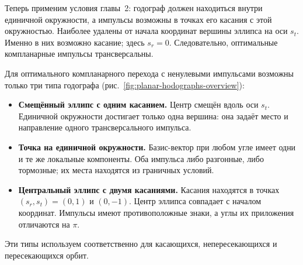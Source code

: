 Теперь применим условия главы~2: годограф должен находиться внутри
единичной окружности, а импульсы возможны в точках его касания
с этой окружностью. Наиболее удалены от начала координат вершины
эллипса на оси $s_t$. Именно в них возможно касание; здесь $s_r=0$.
Следовательно, оптимальные компланарные импульсы трансверсальны.

Для оптимального компланарного перехода с ненулевыми импульсами
возможны только три типа годографа (рис.~\ref{fig:planar-hodographs-overview}):
\begin{itemize}[leftmargin=*]
 \item \textbf{Смещённый эллипс с одним касанием.} Центр смещён вдоль
 оси $s_t$. Единичной окружности достигает только одна вершина:
 она задаёт место и направление одного трансверсального импульса.
 \item \textbf{Точка на единичной окружности.} Базис-вектор при любом
 угле имеет одни и те же локальные компоненты. Оба импульса либо
 разгонные, либо тормозные; их места находятся из граничных условий.
 \item \textbf{Центральный эллипс с двумя касаниями.} Касания находятся
 в точках $(s_r,s_t)=(0,1)$ и $(0,-1)$. Центр эллипса совпадает
 с началом координат. Импульсы имеют противоположные знаки,
 а углы их приложения отличаются на $\pi$.
\end{itemize}
Эти типы используем соответственно для касающихся,
непересекающихся и пересекающихся орбит.



